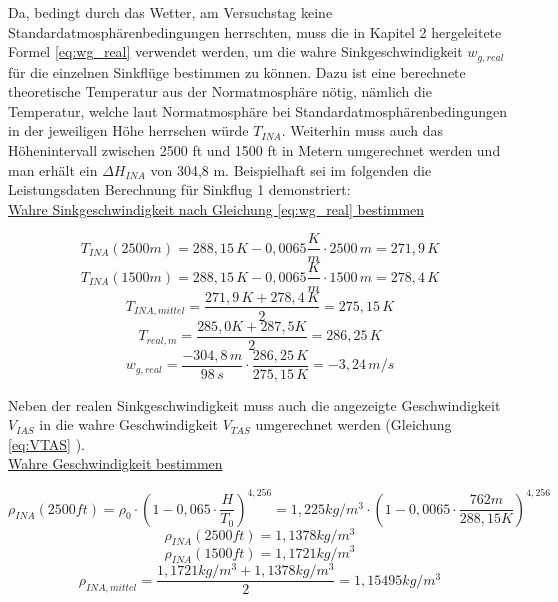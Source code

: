 \noindent Da, bedingt durch das Wetter, am Versuchstag keine Standardatmosphärenbedingungen herrschten, muss die in Kapitel 2 hergeleitete Formel \ref{eq:wg_real} verwendet werden, um die wahre Sinkgeschwindigkeit $w_{g,real}$ für die einzelnen Sinkflüge bestimmen zu können. Dazu ist eine berechnete theoretische Temperatur aus der Normatmosphäre nötig, nämlich die Temperatur, welche laut Normatmosphäre bei Standardatmosphärenbedingungen in der jeweiligen Höhe herrschen würde $T_{INA}$. Weiterhin muss auch das Höhenintervall zwischen 2500 ft und 1500 ft in Metern umgerechnet werden und man erhält ein $\Delta H_{INA}$ von 304,8 m. Beispielhaft sei im folgenden die Leistungsdaten Berechnung für Sinkflug 1 demonstriert:\\

\noindent 
\underline{Wahre Sinkgeschwindigkeit nach Gleichung \ref{eq:wg_real} bestimmen}

\begin{equation*}
T_{INA}(2500m) = 288,15\,K - 0,0065 \frac{K}{m} \cdot 2500\,m = 271,9\,K
\end{equation*}
\begin{equation*}
T_{INA}(1500m) = 288,15\,K - 0,0065 \frac{K}{m} \cdot 1500\,m = 278,4\,K
\end{equation*}
\begin{equation*}
T_{INA,mittel} = \frac{271,9\,K + 278,4\,K}{2} = 275,15\,K
\end{equation*}
\begin{equation*}
T_{real,m} = \frac{285,0 K + 287,5 K}{2} =	286,25\,K
\end{equation*}
\begin{equation*}
w_{g,real} = \frac{-304,8\,m}{98\,s} \cdot \frac{286,25\,K}{275,15\,K} = - 3,24\,m/s
\end{equation*}

\vspace{5mm}
\noindent Neben der realen Sinkgeschwindigkeit muss auch die angezeigte Geschwindigkeit $V_{IAS}$ in die wahre Geschwindigkeit $V_{TAS}$ umgerechnet werden (Gleichung \ref{eq:VTAS} ).\\


\noindent
\underline{Wahre Geschwindigkeit bestimmen}

\begin{equation*}
\rho_{INA}(2500ft) = \rho_0 \cdot (1-0,065\cdot \frac{H}{T_0})^{4,256} = 1,225 kg/m^3 \cdot (1-0,0065\cdot \frac{762 m}{288,15 K})^{4,256}
\end{equation*}
\begin{equation*}
\rho_{INA}(2500ft) = 1,1378 kg/m^3
\end{equation*}
\begin{equation*}
\rho_{INA}(1500ft) = 1,1721 kg/m^3
\end{equation*}
\begin{equation*}
\rho_{INA,mittel} = \frac{1,1721 kg/m^3+1,1378 kg/m^3}{2} = 1,15495 kg/m^3
\end{equation*}

